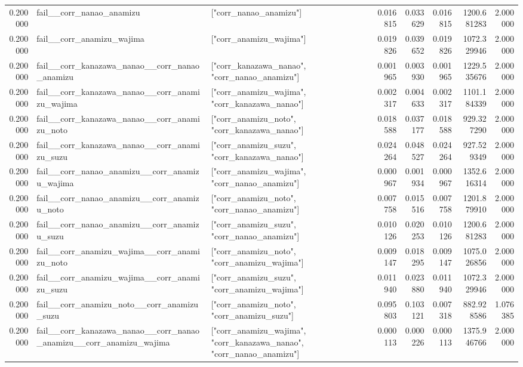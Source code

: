 \begin{tabular}{rllrrrrr}
0.200000 & fail\_\_corr\_nanao\_anamizu & ["corr\_nanao\_anamizu"] & 0.016815 & 0.033629 & 0.016815 & 1200.681283 & 2.000000 \\
0.200000 & fail\_\_corr\_anamizu\_wajima & ["corr\_anamizu\_wajima"] & 0.019826 & 0.039652 & 0.019826 & 1072.329946 & 2.000000 \\
0.200000 & fail\_\_corr\_kanazawa\_nanao\_\_corr\_nanao\_anamizu & ["corr\_kanazawa\_nanao", "corr\_nanao\_anamizu"] & 0.001965 & 0.003930 & 0.001965 & 1229.535676 & 2.000000 \\
0.200000 & fail\_\_corr\_kanazawa\_nanao\_\_corr\_anamizu\_wajima & ["corr\_anamizu\_wajima", "corr\_kanazawa\_nanao"] & 0.002317 & 0.004633 & 0.002317 & 1101.184339 & 2.000000 \\
0.200000 & fail\_\_corr\_kanazawa\_nanao\_\_corr\_anamizu\_noto & ["corr\_anamizu\_noto", "corr\_kanazawa\_nanao"] & 0.018588 & 0.037177 & 0.018588 & 929.327290 & 2.000000 \\
0.200000 & fail\_\_corr\_kanazawa\_nanao\_\_corr\_anamizu\_suzu & ["corr\_anamizu\_suzu", "corr\_kanazawa\_nanao"] & 0.024264 & 0.048527 & 0.024264 & 927.529349 & 2.000000 \\
0.200000 & fail\_\_corr\_nanao\_anamizu\_\_corr\_anamizu\_wajima & ["corr\_anamizu\_wajima", "corr\_nanao\_anamizu"] & 0.000967 & 0.001934 & 0.000967 & 1352.616314 & 2.000000 \\
0.200000 & fail\_\_corr\_nanao\_anamizu\_\_corr\_anamizu\_noto & ["corr\_anamizu\_noto", "corr\_nanao\_anamizu"] & 0.007758 & 0.015516 & 0.007758 & 1201.879910 & 2.000000 \\
0.200000 & fail\_\_corr\_nanao\_anamizu\_\_corr\_anamizu\_suzu & ["corr\_anamizu\_suzu", "corr\_nanao\_anamizu"] & 0.010126 & 0.020253 & 0.010126 & 1200.681283 & 2.000000 \\
0.200000 & fail\_\_corr\_anamizu\_wajima\_\_corr\_anamizu\_noto & ["corr\_anamizu\_noto", "corr\_anamizu\_wajima"] & 0.009147 & 0.018295 & 0.009147 & 1075.026856 & 2.000000 \\
0.200000 & fail\_\_corr\_anamizu\_wajima\_\_corr\_anamizu\_suzu & ["corr\_anamizu\_suzu", "corr\_anamizu\_wajima"] & 0.011940 & 0.023880 & 0.011940 & 1072.329946 & 2.000000 \\
0.200000 & fail\_\_corr\_anamizu\_noto\_\_corr\_anamizu\_suzu & ["corr\_anamizu\_noto", "corr\_anamizu\_suzu"] & 0.095803 & 0.103121 & 0.007318 & 882.928586 & 1.076385 \\
0.200000 & fail\_\_corr\_kanazawa\_nanao\_\_corr\_nanao\_anamizu\_\_corr\_anamizu\_wajima & ["corr\_anamizu\_wajima", "corr\_kanazawa\_nanao", "corr\_nanao\_anamizu"] & 0.000113 & 0.000226 & 0.000113 & 1375.946766 & 2.000000 \\

\end{tabular}
